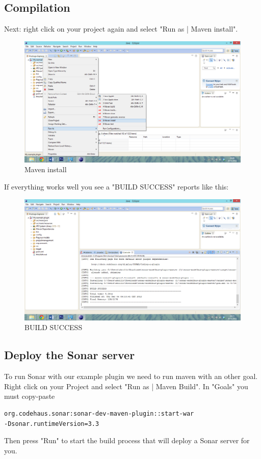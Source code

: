 \subsection{Compilation}
Next: right click on your project again and select "Run as | Maven install".
\begin{figure}
	\centering
		\includegraphics[width=\textwidth]{maveninstall}
	\caption{Maven install}
	\label{fig:maveninstall}
\end{figure} 
If everything works well you see a "BUILD SUCCESS" reports like this:
\begin{figure}
	\centering
		\includegraphics[width=\textwidth]{buildsuccess}
	\caption{BUILD SUCCESS}
	\label{fig:buildsuccess}
\end{figure}



\subsection{Deploy the Sonar server}
To run Sonar with our example plugin we need to run maven with an other goal. Right click on your Project and select "Run as | Maven Build". In "Goals" you must copy-paste 
\begin{verbatim}
org.codehaus.sonar:sonar-dev-maven-plugin::start-war
-Dsonar.runtimeVersion=3.3
\end{verbatim}
Then press "Run" to start the build process that will deploy a Sonar server for you. 

